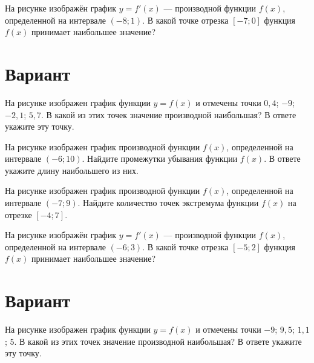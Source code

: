 \begin{taskBN}{4}
На рисунке изображён график $y=f'(x)$ — производной функции $f(x)$, определенной на интервале $(-8;1)$. В какой точке отрезка $[-7; 0]$ функция $f(x)$ принимает наибольшее значение?
\end{taskBN}

\newpage\section{Вариант}\begin{taskBN}{1}
На рисунке изображен график функции $y=f(x)$ и отмечены точки $0,4$; $-9$; $-2,1$; $5,7$. В какой из этих точек значение производной наибольшая? В ответе укажите эту точку. 
\end{taskBN}

\begin{taskBN}{2}
На рисунке изображен график производной функции $f(x)$, определенной на интервале $(-6;10)$. Найдите промежутки убывания функции $f(x)$. В ответе укажите длину наибольшего из них.
\end{taskBN}

\begin{taskBN}{3}
На рисунке изображен график производной функции $f(x)$, определенной на интервале $(-7;9)$. Найдите количество точек экстремума функции $f(x)$ на отрезке $[-4;7]$.
\end{taskBN}

\begin{taskBN}{4}
На рисунке изображён график $y=f'(x)$ — производной функции $f(x)$, определенной на интервале $(-6;3)$. В какой точке отрезка $[-5; 2]$ функция $f(x)$ принимает наибольшее значение?
\end{taskBN}

\newpage\section{Вариант}\begin{taskBN}{1}
На рисунке изображен график функции $y=f(x)$ и отмечены точки $-9$; $9,5$; $1,1$; $5$. В какой из этих точек значение производной наибольшая? В ответе укажите эту точку. 
\end{taskBN}

